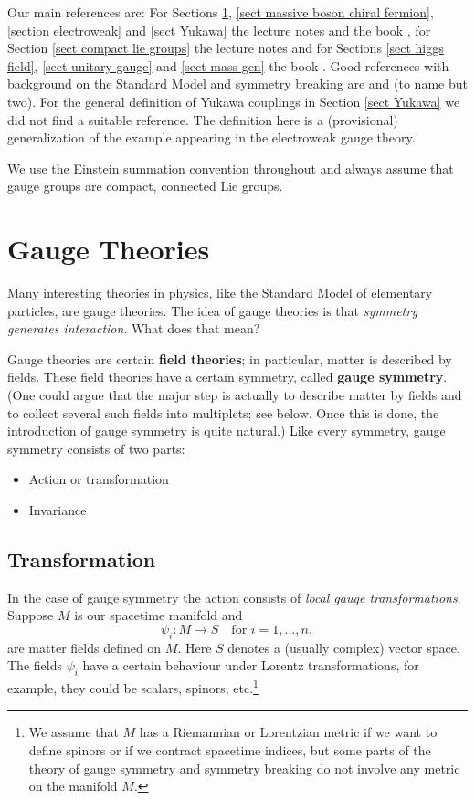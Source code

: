 \documentclass[11pt]{amsart}
\theoremstyle{definition}
\theoremstyle{remark}
\numberwithin{equation}{section}
\begin{document}
Our main references are: For Sections \ref{sect gauge theories}, \ref{sect massive boson chiral fermion}, \ref{section electroweak} and \ref{sect Yukawa} the lecture notes \cite{Louis} and the book \cite{Mosel}, for Section \ref{sect compact lie groups} the lecture notes \cite{Ziller} and for Sections \ref{sect higgs field}, \ref{sect unitary gauge} and \ref{sect mass gen} the book \cite{Bleecker}. Good references with background on the Standard Model and symmetry breaking are \cite{Robinson} and \cite{Ryder} (to name but two). For the general definition of Yukawa couplings in Section \ref{sect Yukawa} we did not find a suitable reference. The definition here is a (provisional) generalization of the example appearing in the electroweak gauge theory. 

We use the Einstein summation convention throughout and always assume that gauge groups are compact, connected Lie groups.

\section{Gauge Theories}\label{sect gauge theories}

Many interesting theories in physics, like the Standard Model of elementary particles, are gauge theories. The idea of gauge theories is that {\em symmetry generates interaction}. What does that mean?

Gauge theories are certain {\bf field theories}; in particular, matter is described by fields. These field theories have a certain symmetry, called {\bf gauge symmetry}. (One could argue that the major step is actually to describe matter by fields and to collect several such fields into multiplets; see below. Once this is done, the introduction of gauge symmetry is quite natural.) Like every symmetry, gauge symmetry consists of two parts:
\begin{itemize}
\item Action or transformation
\item Invariance
\end{itemize}
\subsection{Transformation}
In the case of gauge symmetry the action consists of {\em local gauge transformations}. Suppose $M$ is our spacetime manifold and 
\begin{equation*}
\psi_i\colon M\longrightarrow S\quad\text{for $i=1,\ldots,n$},
\end{equation*}
are matter fields defined on $M$. Here $S$ denotes a (usually complex) vector space. The fields $\psi_i$ have a certain behaviour under Lorentz transformations, for example, they could be scalars, spinors, etc.\footnote{We assume that $M$ has a Riemannian or Lorentzian metric if we want to define spinors or if we contract spacetime indices, but some parts of the theory of gauge symmetry and symmetry breaking do not involve any metric on the manifold $M$.}
\end{document}

